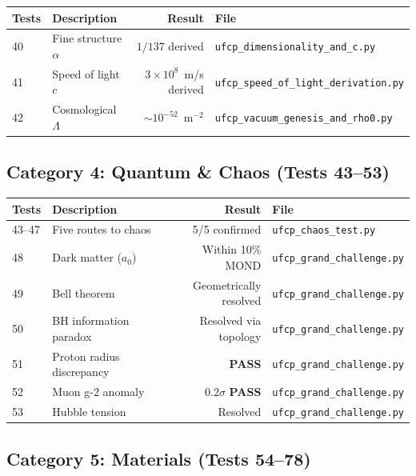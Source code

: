 \documentclass[11pt, a4paper]{article}
\newcommand{\pass}{\textcolor{nm-green}{\textbf{PASS}}}
\begin{document}
\begin{center}
\begin{tabular}{@{}llrl@{}}
\toprule
\textbf{Tests} & \textbf{Description} & \textbf{Result} &
\textbf{File} \\
\midrule
40 & Fine structure $\alpha$ & $1/137$ derived &
  \texttt{ufcp\_dimensionality\_and\_c.py} \\
41 & Speed of light $c$ & $3\times10^8$~m/s derived &
  \texttt{ufcp\_speed\_of\_light\_derivation.py} \\
42 & Cosmological $\Lambda$ & $\sim10^{-52}$~m$^{-2}$ &
  \texttt{ufcp\_vacuum\_genesis\_and\_rho0.py} \\
\bottomrule
\end{tabular}
\end{center}

\subsection{Category 4: Quantum \& Chaos (Tests 43--53)}

\begin{center}
\begin{tabular}{@{}llrl@{}}
\toprule
\textbf{Tests} & \textbf{Description} & \textbf{Result} &
\textbf{File} \\
\midrule
43--47 & Five routes to chaos & 5/5 confirmed &
  \texttt{ufcp\_chaos\_test.py} \\
48 & Dark matter ($a_0$) & Within 10\% MOND &
  \texttt{ufcp\_grand\_challenge.py} \\
49 & Bell theorem & Geometrically resolved &
  \texttt{ufcp\_grand\_challenge.py} \\
50 & BH information paradox & Resolved via topology &
  \texttt{ufcp\_grand\_challenge.py} \\
51 & Proton radius discrepancy & \pass &
  \texttt{ufcp\_grand\_challenge.py} \\
52 & Muon g-2 anomaly & $0.2\sigma$ \pass &
  \texttt{ufcp\_grand\_challenge.py} \\
53 & Hubble tension & Resolved &
  \texttt{ufcp\_grand\_challenge.py} \\
\bottomrule
\end{tabular}
\end{center}

\subsection{Category 5: Materials (Tests 54--78)}
\end{document}
